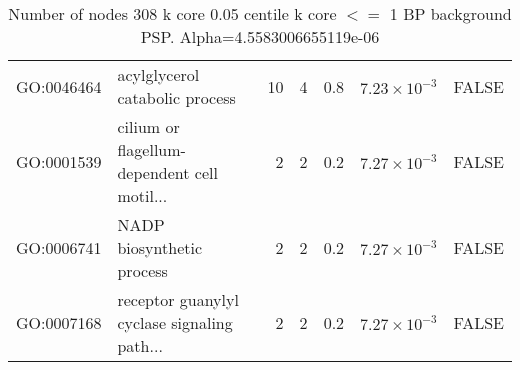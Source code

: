 \begin{table}[ht]
\begin{adjustbox}{width=\textwidth}
\begin{tabular}{llrrrrl}
  GO:0046464 & acylglycerol catabolic process & 10 & 4 & 0.8 & $7.23 \times 10^{-3}$ & FALSE \\ 
  GO:0001539 & cilium or flagellum-dependent cell motil... & 2 & 2 & 0.2 & $7.27 \times 10^{-3}$ & FALSE \\ 
  GO:0006741 & NADP biosynthetic process & 2 & 2 & 0.2 & $7.27 \times 10^{-3}$ & FALSE \\ 
  GO:0007168 & receptor guanylyl cyclase signaling path... & 2 & 2 & 0.2 & $7.27 \times 10^{-3}$ & FALSE \\ 
   \hline
\end{tabular}
\end{adjustbox}
\caption{Number of nodes 308 k core 0.05 centile  k core $<=$ 1 BP background PSP. Alpha=4.5583006655119e-06} 
\label{tab:Number of nodes 308 k core 0.05 centile  k core $<=$ 1 BP background PSP. Alpha=4.5583006655119e-06}
\end{table}

